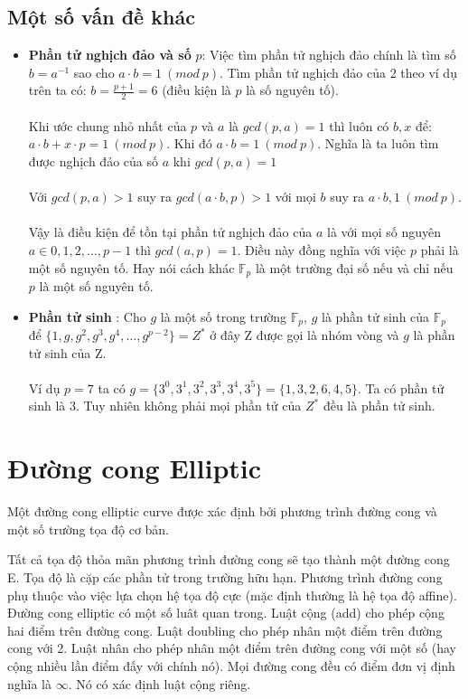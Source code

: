 \documentclass[a4paper,12pt]{report}
\begin{document}
\subsection*{Một số vấn đề khác}
\begin{itemize}
\item \textbf{Phần tử nghịch đảo  và số} $p$: Việc tìm phần tử nghịch đảo chính là tìm số $b = a^{-1}$ sao cho $a \cdot b = 1 \ (mod \ p)$. Tìm phần tử nghịch đảo của 2 theo ví dụ trên ta có: $\displaystyle b = \frac{p+1}{2} = 6$ (điều kiện là $p$ là số nguyên tố). \\ \\
Khi ước chung nhỏ nhất của $p$ và $a$ là $gcd(p, a) = 1$ thì luôn có $b, x$ để: $a \cdot b + x \cdot p = 1 \ (mod \ p)$. Khi đó $a \cdot b = 1 \ (mod \ p)$. Nghĩa là ta luôn tìm được nghịch đảo của số $a$ khi $gcd(p, a) = 1$ \\ \\
Với $gcd(p, a) > 1$ suy ra $gcd(a \cdot b, p) > 1$ với mọi $b$ suy ra $a \cdot b , 1 \ (mod \ p)$. \\ \\
Vậy là điều kiện để tồn tại phần tử nghịch đảo của $a$ là với mọi số nguyên $a \in {0, 1, 2, \ldots , p-1}$ thì $gcd(a, p) = 1$. Điều này đồng nghĩa với việc $p$ phải là một số nguyên tố. Hay nói cách khác $\mathbb{F}_p$ là một trường đại số nếu và chỉ nếu $p$ là một số nguyên tố.
\item \textbf{Phần tử sinh }: Cho $g$ là một số trong trường $\mathbb{F}_p$, $g$ là phần tử sinh của $\mathbb{F}_p$ để $\{1, g, g^2, g^3, g^4, \ldots, g^{p-2}\} = Z^*$ ở đây Z được gọi là nhóm vòng  và $g$ là phần tử sinh của Z. \\ \\
Ví dụ $p = 7$ ta có $g = \{ 3^0, 3^1, 3^2, 3^3, 3^4, 3^5 \} = \{1, 3, 2, 6, 4, 5\}$. Ta có phần tử sinh là 3. Tuy nhiên không phải mọi phần tử của $Z^*$ đều là phần tử sinh.
\end{itemize}
\section{Đường cong Elliptic}
Một đường cong elliptic curve được xác định bởi phương trình đường cong và một số trường tọa độ cơ bản.

Tất cả tọa độ thỏa mãn phương trình đường cong sẽ tạo thành một đường cong E. Tọa độ là cặp các phần tử trong trường hữu hạn. Phương trình đường cong phụ thuộc vào việc lựa chọn hệ tọa độ cực (mặc định thường là hệ tọa độ affine). Đường cong elliptic có một số luât quan trong. Luật cộng (add) cho phép cộng hai điểm trên đường cong. Luật doubling cho phép nhân một điểm trên đường cong với 2. Luật nhân cho phép nhân một điểm trên đường cong với một số (hay cộng nhiều lần điểm đấy với chính nó). Mọi đường cong đều có điểm đơn vị định nghĩa là $\infty$. Nó có xác định luật cộng riêng.
\end{document}
